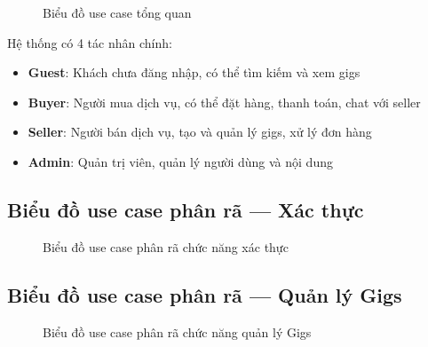 \documentclass[12pt]{extreport}
\begin{document}
\begin{figure}[H]
    \centering
    \caption{Biểu đồ use case tổng quan}
    \label{fig:uc_tongquan}
\end{figure}

Hệ thống có 4 tác nhân chính:
\begin{itemize}
    \item \textbf{Guest}: Khách chưa đăng nhập, có thể tìm kiếm và xem gigs
    \item \textbf{Buyer}: Người mua dịch vụ, có thể đặt hàng, thanh toán, chat với seller
    \item \textbf{Seller}: Người bán dịch vụ, tạo và quản lý gigs, xử lý đơn hàng
    \item \textbf{Admin}: Quản trị viên, quản lý người dùng và nội dung
\end{itemize}

\subsection{Biểu đồ use case phân rã --- Xác thực}

\begin{figure}[H]
    \centering
    \caption{Biểu đồ use case phân rã chức năng xác thực}
    \label{fig:uc_auth}
\end{figure}

\subsection{Biểu đồ use case phân rã --- Quản lý Gigs}

\begin{figure}[H]
    \centering
    \caption{Biểu đồ use case phân rã chức năng quản lý Gigs}
    \label{fig:uc_gig}
\end{figure}
\end{document}
